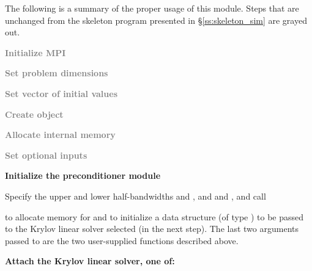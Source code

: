 The following is a summary of the proper usage of this module. Steps that are
unchanged from the skeleton program presented in \S\ref{ss:skeleton_sim} are grayed out.
\begin{Steps}
\item 
  \textcolor{gray}{\bf Initialize MPI}

\item
  \textcolor{gray}{\bf Set problem dimensions}

\item
  \textcolor{gray}{\bf Set vector of initial values}
 
\item
  \textcolor{gray}{\bf Create {\cvodes} object}

\item
  \textcolor{gray}{\bf Allocate internal memory}

\item
  \textcolor{gray}{\bf Set optional inputs}

\item \label{i:bbdpre_init}
  {\bf Initialize the {\cvbbdpre} preconditioner module}

  Specify the upper and lower half-bandwidths  and , and
   and , and call 


  to allocate memory for and to initialize a data structure 
  (of type ) to be passed to the Krylov linear solver selected
  (in the next step).  The last two arguments passed to 
  are the two user-supplied functions described above.

\item \label{i:bbdpre_attach}
  {\bf Attach the Krylov linear solver, one of:}





\end{Steps}
